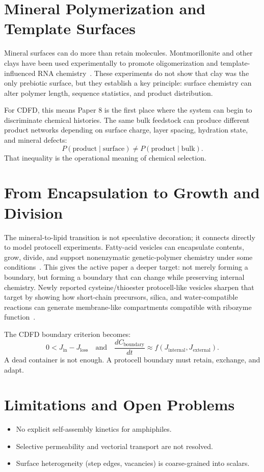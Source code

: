 \documentclass[11pt,a4paper]{article}
\begin{document}
\section{Mineral Polymerization and Template Surfaces}
Mineral surfaces can do more than retain molecules. Montmorillonite and other clays have been used experimentally to promote oligomerization and template-influenced RNA chemistry~\cite{Ferris1996,Ertem1996}. These experiments do not show that clay was the only prebiotic surface, but they establish a key principle: surface chemistry can alter polymer length, sequence statistics, and product distribution.

For CDFD, this means Paper 8 is the first place where the system can begin to discriminate chemical histories. The same bulk feedstock can produce different product networks depending on surface charge, layer spacing, hydration state, and mineral defects:
\begin{equation}
P(\mathrm{product}\mid \mathrm{surface})
\neq
P(\mathrm{product}\mid \mathrm{bulk}).
\end{equation}
That inequality is the operational meaning of chemical selection.

\section{From Encapsulation to Growth and Division}
The mineral-to-lipid transition is not speculative decoration; it connects directly to model protocell experiments. Fatty-acid vesicles can encapsulate contents, grow, divide, and support nonenzymatic genetic-polymer chemistry under some conditions~\cite{Hanczyc2003,Mansy2008,Adamala2013}. This gives the active paper a deeper target: not merely forming a boundary, but forming a boundary that can change while preserving internal chemistry. Newly reported cysteine/thioester protocell-like vesicles sharpen that target by showing how short-chain precursors, silica, and water-compatible reactions can generate membrane-like compartments compatible with ribozyme function~\cite{Cho2025}.

The CDFD boundary criterion becomes:
\begin{equation}
0 < J_{\mathrm{in}} - J_{\mathrm{loss}}
\quad \text{and} \quad
\frac{dC_{\mathrm{boundary}}}{dt}
\approx
f(J_{\mathrm{internal}},J_{\mathrm{external}}).
\end{equation}
A dead container is not enough. A protocell boundary must retain, exchange, and adapt.

\section{Limitations and Open Problems}
\begin{itemize}
\item No explicit self-assembly kinetics for amphiphiles.
\item Selective permeability and vectorial transport are not resolved.
\item Surface heterogeneity (step edges, vacancies) is coarse-grained into scalars.
\end{itemize}
\end{document}
